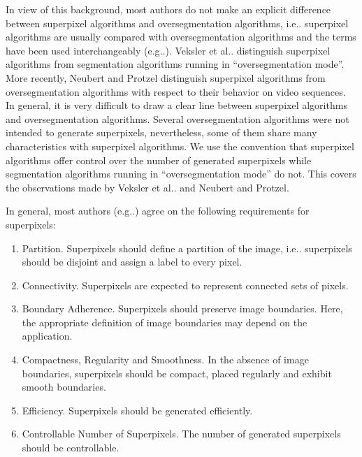 \documentclass[5p]{elsarticle}
\makeatletter
\DeclareRobustCommand\onedot{\futurelet\@let@token\@onedot}
\def\@onedot{\ifx\@let@token.\else.\null\fi\xspace}
\def\eg{{e.g}\onedot} \def\Eg{{E.g}\onedot}
\def\ie{{i.e}\onedot} \def\Ie{{I.e}\onedot}
\def\etal{{et al}\onedot}
\makeatother
\begin{document}
In view of this background, most authors do not make an explicit difference between superpixel algorithms and
oversegmentation algorithms, \ie superpixel algorithms are usually compared with
oversegmentation algorithms and the terms have been used interchangeably
(\eg \cite{LevinshteinStereKutulakosFleetDickinsonSiddiqi:2009,SchickFischerStiefelhagen:2012,NeubertProtzel:2012}).
Veksler \etal \cite{VekslerBoykovMehrani:2010} distinguish superpixel algorithms
from segmentation algorithms running in ``oversegmentation mode''. More recently,
Neubert and Protzel \cite{NeubertProtzel:2013} distinguish superpixel algorithms
from oversegmentation algorithms with respect to their behavior on video sequences.
In general, it is very difficult to draw a clear line between superpixel algorithms
and oversegmentation algorithms. Several oversegmentation algorithms were not intended
to generate superpixels, nevertheless, some of them share many characteristics
with superpixel algorithms. We use the convention that superpixel
algorithms offer control over the number of generated superpixels while segmentation
algorithms running in ``oversegmentation mode'' do not. This covers the observations
made by Veksler \etal and Neubert and Protzel.

In general, most authors (\eg \cite{LevinshteinStereKutulakosFleetDickinsonSiddiqi:2009,LiuTuzelRamalingamChellappa:2011,AchantaShajiSmithLucchiFuaSuesstrunk:2012,SchickFischerStiefelhagen:2012})
agree on the following requirements for superpixels:
\begin{enumerate}[label=--,leftmargin=0.25cm,noitemsep]
    \item Partition. Superpixels should define a partition of the image,
        \ie superpixels should be disjoint and assign a label to every pixel.
    \item Connectivity. Superpixels are expected to represent connected sets of pixels.
    \item Boundary Adherence. Superpixels should preserve image boundaries.
        Here, the appropriate definition of image boundaries may depend on the application.
    \item Compactness, Regularity and Smoothness. In the absence of image boundaries,
        superpixels should be compact, placed regularly and exhibit smooth boundaries.
    \item Efficiency. Superpixels should be generated efficiently.
    \item Controllable Number of Superpixels. The number of generated superpixels should be controllable.
\end{enumerate}
\end{document}
